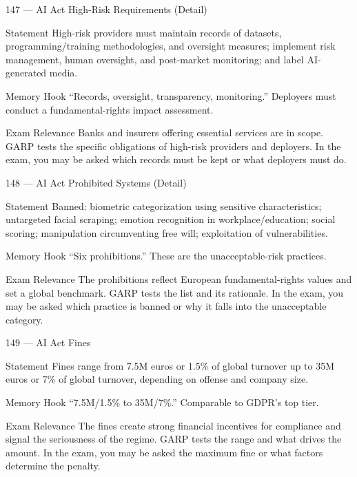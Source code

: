 \documentclass[aspectratio=169,8pt]{beamer}
\begin{document}
	\begin{frame}{147 --- AI Act High-Risk Requirements (Detail)}
		\begin{block}{Statement}
			High-risk providers must maintain records of datasets, programming/training methodologies, and oversight measures; implement risk management, human oversight, and post-market monitoring; and label AI-generated media.
		\end{block}
		\begin{block}{Memory Hook}
			``Records, oversight, transparency, monitoring.'' Deployers must conduct a fundamental-rights impact assessment.
		\end{block}
		\begin{block}{Exam Relevance}
			Banks and insurers offering essential services are in scope. GARP tests the specific obligations of high-risk providers and deployers. In the exam, you may be asked which records must be kept or what deployers must do.
		\end{block}
	\end{frame}
	
	\begin{frame}{148 --- AI Act Prohibited Systems (Detail)}
		\begin{block}{Statement}
			Banned: biometric categorization using sensitive characteristics; untargeted facial scraping; emotion recognition in workplace/education; social scoring; manipulation circumventing free will; exploitation of vulnerabilities.
		\end{block}
		\begin{block}{Memory Hook}
			``Six prohibitions.'' These are the unacceptable-risk practices.
		\end{block}
		\begin{block}{Exam Relevance}
			The prohibitions reflect European fundamental-rights values and set a global benchmark. GARP tests the list and its rationale. In the exam, you may be asked which practice is banned or why it falls into the unacceptable category.
		\end{block}
	\end{frame}
	
	\begin{frame}{149 --- AI Act Fines}
		\begin{block}{Statement}
			Fines range from 7.5M euros or 1.5\% of global turnover up to 35M euros or 7\% of global turnover, depending on offense and company size.
		\end{block}
		\begin{block}{Memory Hook}
			``7.5M/1.5\% to 35M/7\%.'' Comparable to GDPR's top tier.
		\end{block}
		\begin{block}{Exam Relevance}
			The fines create strong financial incentives for compliance and signal the seriousness of the regime. GARP tests the range and what drives the amount. In the exam, you may be asked the maximum fine or what factors determine the penalty.
		\end{block}
	\end{frame}
	
\end{document}
